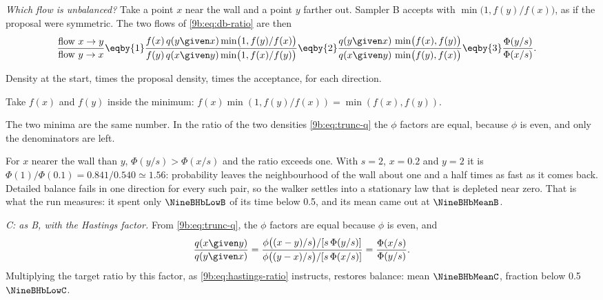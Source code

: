 \emph{Which flow is unbalanced?} Take a point $x$ near the wall and a point $y$ farther out.
Sampler B accepts with $\min\bigl(1,f(y)/f(x)\bigr)$, as if the proposal were symmetric. The
two flows of \eqref{9b:eq:db-ratio} are then
\begin{align*}
  \frac{\text{flow }x\to y}{\text{flow }y\to x}
  &\eqby{1}\frac{f(x)\,q(y\given x)\min\bigl(1,f(y)/f(x)\bigr)}
               {f(y)\,q(x\given y)\min\bigl(1,f(x)/f(y)\bigr)}
   \eqby{2}\frac{q(y\given x)\,\min\bigl(f(x),f(y)\bigr)}{q(x\given y)\,\min\bigl(f(y),f(x)\bigr)}
   \eqby{3}\frac{\Phi(y/s)}{\Phi(x/s)} .
\end{align*}
\begin{explain}
  \item Density at the start, times the proposal density, times the acceptance, for each
        direction.
  \item Take $f(x)$ and $f(y)$ inside the minimum: $f(x)\min(1,f(y)/f(x))=\min(f(x),f(y))$.
  \item The two minima are the same number. In the ratio of the two densities
        \eqref{9b:eq:trunc-q} the $\phi$ factors are equal, because $\phi$ is even, and only the
        denominators are left.
\end{explain}
For $x$ nearer the wall than $y$, $\Phi(y/s)>\Phi(x/s)$ and the ratio exceeds one. With $s=2$,
$x=0.2$ and $y=2$ it is $\Phi(1)/\Phi(0.1)=0.841/0.540\simeq1.56$: probability leaves the
neighbourhood of the wall about one and a half times as fast as it comes back. Detailed balance
fails in one direction for every such pair, so the walker settles into a stationary law that is
depleted near zero. That is what the run measures: it spent only $\NineBHbLowB$ of its time below
0.5, and its mean came out at $\NineBHbMeanB$.

\emph{C: as B, with the Hastings factor.} From \eqref{9b:eq:trunc-q}, the $\phi$ factors are
equal because $\phi$ is even, and
\begin{equation*}
  \frac{q(x\given y)}{q(y\given x)}
  =\frac{\phi\bigl((x-y)/s\bigr)/[s\,\Phi(y/s)]}{\phi\bigl((y-x)/s\bigr)/[s\,\Phi(x/s)]}
  =\frac{\Phi(x/s)}{\Phi(y/s)} .
\end{equation*}
Multiplying the target ratio by this factor, as \eqref{9b:eq:hastings-ratio} instructs, restores
balance: mean $\NineBHbMeanC$, fraction below 0.5 $\NineBHbLowC$.

